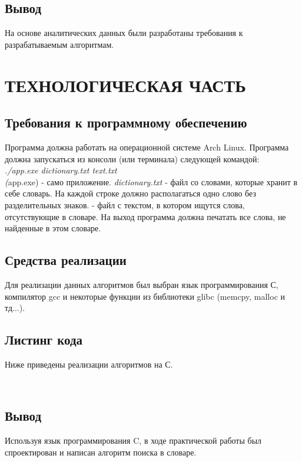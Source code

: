 \documentclass[a4paper,12pt]{article}
\begin{document}
\newpage
\subsection{Вывод}
На основе аналитических данных были разработаны требования к разрабатываемым алгоритмам.


\newpage
\section{ТЕХНОЛОГИЧЕСКАЯ ЧАСТЬ}
\subsection{Требования к программному обеспечению}

Программа должна работать на операционной системе Arch Linux. 
Программа должна запускаться из консоли (или терминала) следующей командой:\\
\textit{./app.exe dictionary.txt text.txt} \\
\textit(app.exe) - само приложение. \textit{dictionary.txt} - файл со словами, которые хранит в себе словарь. На каждой строке должно располагаться одно слово без разделительных знаков.  - файл с текстом, в котором ищутся слова, отсутствующие в словаре.
На выход программа должна печатать все слова, не найденные в этом словаре.

\newpage
\subsection{Средства реализации}
Для реализации данных алгоритмов был выбран язык программирования С, компилятор gcc и некоторые функции из библиотеки glibc (memcpy, malloc и тд...). \\

\newpage
\subsection{Листинг кода}
Ниже приведены реализации алгоритмов на С.\\

\

\newpage
\subsection{Вывод}
Используя язык программирования C, в ходе практической работы был спроектирован и написан алгоритм поиска в словаре.
\end{document}
